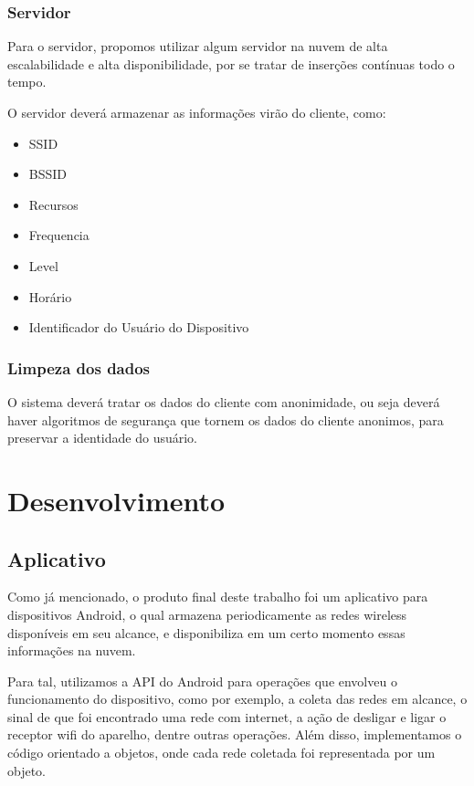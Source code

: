 \documentclass[12pt, %
openright, 
oneside,
a4paper,
brazil]{facom-ufu-abntex2}
\begin{document}
\subsection{Servidor}
Para o servidor, propomos utilizar algum servidor na nuvem de alta escalabilidade e alta disponibilidade, por se tratar de inserções contínuas todo o tempo.

O servidor deverá armazenar as informações virão do cliente, como:
\begin{itemize}
  \item SSID
  \item BSSID
  \item Recursos
  \item Frequencia
  \item Level
  \item Horário
  \item Identificador do Usuário do Dispositivo
  \end{itemize}
  
\subsection{Limpeza dos dados}
O sistema deverá tratar os dados do cliente com anonimidade, ou seja deverá haver algoritmos de segurança que tornem os dados do cliente anonimos, para preservar a identidade do usuário.


\chapter{Desenvolvimento}

\section{Aplicativo}
Como já mencionado, o produto final deste trabalho foi um aplicativo para dispositivos Android, o qual armazena periodicamente as redes wireless disponíveis em seu alcance, e disponibiliza em um certo momento essas informações na nuvem.

Para tal, utilizamos a API do Android para operações que envolveu o funcionamento do dispositivo, como por exemplo, a coleta das redes em alcance, o sinal de que foi encontrado uma rede com internet, a ação de desligar e ligar o receptor wifi do aparelho, dentre outras operações. Além disso, implementamos o código orientado a objetos, onde cada rede coletada foi representada por um objeto.
\end{document}
